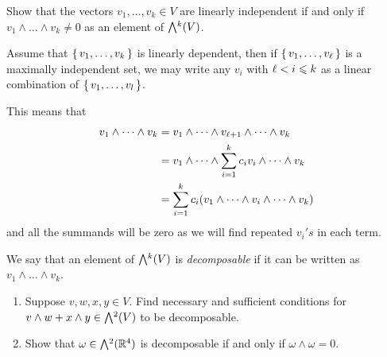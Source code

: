 \documentclass[12pt]{memoir}
\begin{document}
\begin{Ej}
    Show that the vectors $v_1, \ldots , v_k \in V$ are linearly independent if and only if $v_1 \wedge \ldots \wedge v_k \neq 0$ as an element of $\exterior^k(V)$.
\end{Ej}

\begin{ptcbr}
    Assume that $\{\,v_1,\dots,v_k\,\}$ is linearly dependent, then if $\{\,v_1,\dots,v_\ell\,\}$ is a maximally independent set, we may write any $v_i$ with $\ell<i\leqslant k$ as a linear combination of $\{\,v_1,\dots,v_l\,\}$.\par
    This means that 
    \begin{align*}
        v_1\wedge\cdots\wedge v_k&=v_1\wedge\cdots\wedge v_{\ell+1}\wedge\cdots\wedge v_k\\
        &=v_1\wedge\cdots\wedge \sum_{i=1}^kc_iv_i\wedge\cdots\wedge v_k\\
        &=\sum_{i=1}^kc_i(v_1\wedge\cdots\wedge v_i\wedge\cdots\wedge v_k)
    \end{align*}
    and all the summands will be zero as we will find repeated $v_i's$ in each term.
\end{ptcbr}

\begin{Ej}
    We say that an element of $\exterior^k(V)$ is \emph{decomposable} if it can be written as $v_1 \wedge \ldots \wedge v_k$.
	\begin{enumerate}
		\item Suppose $v,w,x,y \in V$. Find necessary and sufficient conditions for $v \wedge w + x \wedge y \in \exterior^2(V)$ to be decomposable.
		
		\item Show that $\omega \in \exterior^{2}(\bR^4)$ is decomposable if and only if $\omega \wedge \omega = 0$.
	\end{enumerate}
\end{Ej}
\end{document}
